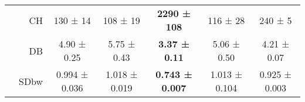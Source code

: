 \begin{tabularx}{\linewidth}{X r *{5}{c}}
 & CH & {\cellcolor[HTML]{F6FCF4}} \color[HTML]{000000} 130 \mdseries ± 14 & {\cellcolor[HTML]{F7FCF5}} \color[HTML]{000000} 108 \mdseries ± 19 & {\cellcolor[HTML]{73C476}} \color[HTML]{000000} \bfseries 2290 \mdseries ± 108 & {\cellcolor[HTML]{F7FCF5}} \color[HTML]{000000} 116 \mdseries ± 28 & {\cellcolor[HTML]{F3FAF0}} \color[HTML]{000000} 240 \mdseries ± 5 \\
 & DB & {\cellcolor[HTML]{D9F0D3}} \color[HTML]{000000} 4.90 \mdseries ± 0.25 & {\cellcolor[HTML]{F7FCF5}} \color[HTML]{000000} 5.75 \mdseries ± 0.43 & {\cellcolor[HTML]{75C477}} \color[HTML]{000000} \bfseries 3.37 \mdseries ± 0.11 & {\cellcolor[HTML]{E0F3DB}} \color[HTML]{000000} 5.06 \mdseries ± 0.50 & {\cellcolor[HTML]{B1E0AB}} \color[HTML]{000000} 4.21 \mdseries ± 0.07 \\
 & SDbw & {\cellcolor[HTML]{F1FAEE}} \color[HTML]{000000} 0.994 \mdseries ± 0.036 & {\cellcolor[HTML]{F7FCF5}} \color[HTML]{000000} 1.018 \mdseries ± 0.019 & {\cellcolor[HTML]{75C477}} \color[HTML]{000000} \bfseries 0.743 \mdseries ± 0.007 & {\cellcolor[HTML]{F6FCF4}} \color[HTML]{000000} 1.013 \mdseries ± 0.104 & {\cellcolor[HTML]{DBF1D5}} \color[HTML]{000000} 0.925 \mdseries ± 0.003 \\

\bottomrule
\end{tabularx}